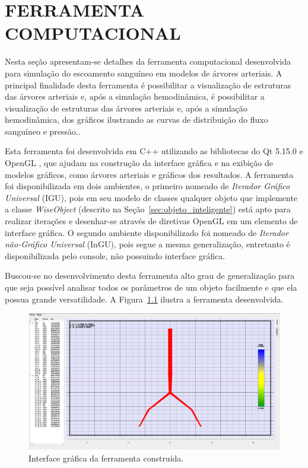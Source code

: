 \chapter{FERRAMENTA COMPUTACIONAL}\label{sec:ferramenta_computacional}

Nesta seção apresentam-se detalhes da ferramenta computacional desenvolvida para simulação do escoamento sanguíneo em modelos de árvores arteriais. A principal finalidade desta ferramenta é possibilitar a visualização de estruturas das árvores arteriais e, após a simulação hemodinâmica,  é possibilitar a visualização de estruturas das árvores arteriais e, após a simulação hemodinâmica, dos gráficos ilustrando as curvas de distribuição do fluxo sanguíneo e pressão..

Esta ferramenta foi desenvolvida em C++ utilizando as bibliotecas do Qt 5.15.0 \cite{QTClasses} e OpenGL \cite{OpenGL}, que ajudam na construção da interface gráfica e na exibição de modelos gráficos, como árvores arteriais e gráficos dos resultados. A ferramenta foi disponibilizada em dois ambientes, o primeiro nomeado de \textit{Iterador Gráfico Universal} (IGU), pois em seu modelo de classes qualquer objeto que implemente a classe \textit{WiseObject} (descrito na Seção~\ref{sec:objeto_inteligente}) está apto para realizar iterações e desenhar-se através de diretivas OpenGL em um elemento de interface gráfica. O segundo ambiente disponibilizado foi nomeado de \textit{Iterador não-Gráfico Universal} (InGU), pois segue a mesma generalização, entretanto é disponibilizada pelo console, não possuindo interface gráfica.

Buscou-se no desenvolvimento desta ferramenta alto grau de generalização para que seja possível analisar todos os parâmetros de um objeto facilmente e que ela possua grande versatilidade.  A Figura~\ref{fig1:gui} ilustra a ferramenta desenvolvida.

\begin{figure}[!htbp]
	\centering
	\includegraphics[scale=0.25]{Figures/IGU_002.png}
	\caption{Interface gráfica da ferramenta construída.}
	\label{fig1:gui}
\end{figure}



